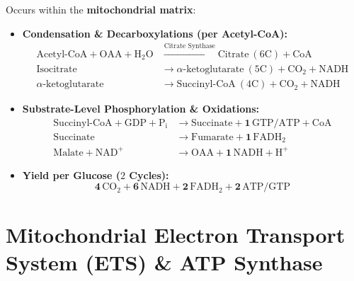 \documentclass[10pt,twoside,openright]{book}
\begin{document}
\begin{formulabox}
Occurs within the \textbf{mitochondrial matrix}:
\begin{itemize}[leftmargin=*]
  \item \textbf{Condensation \& Decarboxylations (per Acetyl-CoA):}
  \begin{align*}
    \text{Acetyl-CoA} + \text{OAA} + \mathrm{H_2O} &\xrightarrow{\text{Citrate Synthase}} \text{Citrate}\ (6\mathrm{C}) + \mathrm{CoA} \\
    \text{Isocitrate} &\longrightarrow \alpha\text{-ketoglutarate}\ (5\mathrm{C}) + \mathrm{CO_2} + \mathrm{NADH} \\
    \alpha\text{-ketoglutarate} &\longrightarrow \text{Succinyl-CoA}\ (4\mathrm{C}) + \mathrm{CO_2} + \mathrm{NADH}
  \end{align*}
  \item \textbf{Substrate-Level Phosphorylation \& Oxidations:}
  \begin{align*}
    \text{Succinyl-CoA} + \mathrm{GDP} + \mathrm{P_i} &\longrightarrow \text{Succinate} + \mathbf{1\,\mathrm{GTP/ATP}} + \mathrm{CoA} \\
    \text{Succinate} &\longrightarrow \text{Fumarate} + \mathbf{1\,\mathrm{FADH_2}} \\
    \text{Malate} + \mathrm{NAD}^+ &\longrightarrow \mathrm{OAA} + \mathbf{1\,\mathrm{NADH} + \mathrm{H}^+}
  \end{align*}
  \item \textbf{Yield per Glucose ($2$ Cycles):}
  \[
    \mathbf{4\,\mathrm{CO_2}} + \mathbf{6\,\mathrm{NADH}} + \mathbf{2\,\mathrm{FADH_2}} + \mathbf{2\,\mathrm{ATP/GTP}}
  \]
\end{itemize}
\end{formulabox}

\section{Mitochondrial Electron Transport System (ETS) \& ATP Synthase}
\end{document}
